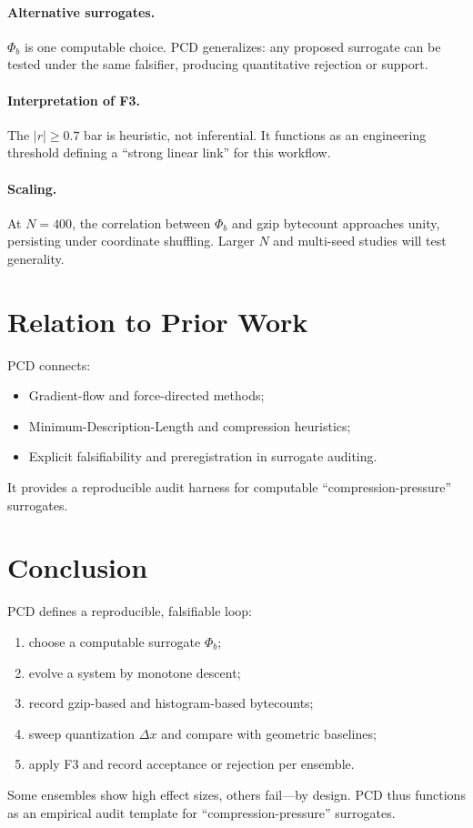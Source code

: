 \documentclass[11pt,a4paper]{article}
\numberwithin{equation}{section}
\newcommand{\phib}{\Phi_b}
\begin{document}
\paragraph{Alternative surrogates.}
$\phib$ is one computable choice.  PCD generalizes: any proposed surrogate can be tested under the same falsifier, producing quantitative rejection or support.

\paragraph{Interpretation of F3.}
The $|r|\ge0.7$ bar is heuristic, not inferential.  It functions as an engineering threshold defining a “strong linear link” for this workflow.

\paragraph{Scaling.}
At $N{=}400$, the correlation between $\phib$ and gzip bytecount approaches unity, persisting under coordinate shuffling.  Larger $N$ and multi-seed studies will test generality.

\section{Relation to Prior Work}
PCD connects:
\begin{itemize}
\item Gradient-flow and force-directed methods;
\item Minimum-Description-Length and compression heuristics;
\item Explicit falsifiability and preregistration in surrogate auditing.
\end{itemize}
It provides a reproducible audit harness for computable “compression-pressure” surrogates.

\section{Conclusion}
PCD defines a reproducible, falsifiable loop:
\begin{enumerate}[label=(\arabic*)]
\item choose a computable surrogate $\phib$;
\item evolve a system by monotone descent;
\item record gzip-based and histogram-based bytecounts;
\item sweep quantization $\Delta x$ and compare with geometric baselines;
\item apply F3 and record acceptance or rejection per ensemble.
\end{enumerate}
Some ensembles show high effect sizes, others fail—by design.  
PCD thus functions as an empirical audit template for “compression-pressure” surrogates.
\end{document}
